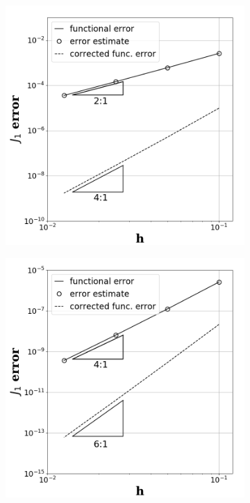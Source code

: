 \documentclass[a4paper]{article}
\begin{document}
\begin{figure}[!htbp]
  \centering
  \centering
  \begin{subfigure}{0.45\textwidth}
    \centering
    \includegraphics[width=1.0\linewidth]{figures/subsonic_p1_J1.png}
    \label{fig:subsonic_p1_j1}
  \end{subfigure}
  \begin{subfigure}{0.45\textwidth}
    \centering
    \includegraphics[width=1.0\linewidth]{figures/subsonic_p2_J1.png}

\end{subfigure}
\end{figure}
\end{document}
